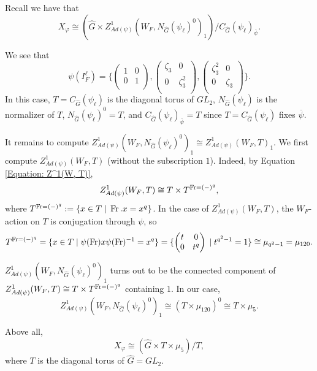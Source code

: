 \begin{eg}
    Recall we have that
    $$X_{\varphi} \cong (\hat{G} \times Z^1_{Ad(\psi)}(W_F, N_{\hat{G}}(\psi_{\ell})^0)_1)/C_{\hat{G}}(\psi_{\ell})_{\overline{\psi}}.$$
    
    We see that 
    $$\psi(I_F^{\ell})=\{
    \begin{pmatrix}
    	1 & 0 \\
    	0 & 1 \\
    \end{pmatrix},
    \begin{pmatrix}
    	\zeta_3 & 0 \\
    	0 & \zeta_3^2 \\
    \end{pmatrix},
    \begin{pmatrix}
    	\zeta_3^2 & 0 \\
    	0 & \zeta_3 \\
    \end{pmatrix}
    \}.$$ 
    In this case, $T=C_{\hat{G}}(\psi_{\ell})$ is the diagonal torus of $GL_2$, $N_{\hat{G}}(\psi_{\ell})$ is the normalizer of $T$, $N_{\hat{G}}(\psi_{\ell})^0=T$, and $C_{\hat{G}}(\psi_{\ell})_{\overline{\psi}}=T$ since $T=C_{\hat{G}}(\psi_{\ell})$ fixes $\overline{\psi}$.
    
    It remains to compute $Z^1_{Ad(\psi)}(W_F, N_{\hat{G}}(\psi_{\ell})^0)_1 \cong Z^1_{Ad(\psi)}(W_F, T)_1$. We first compute $Z^1_{Ad(\psi)}(W_F, T)$ (without the subscription $1$). Indeed, by Equation \ref{Equation: Z^1(W, T)}, 
    $$Z^1_{Ad(\psi)}(W_F, T) \cong T \times T^{\operatorname{Fr}=(-)^q},$$
    where $T^{\operatorname{Fr}=(-)^q}:=\{x \in T \;|\; \operatorname{Fr}.x=x^q\}$.
    In the case of $Z^1_{Ad(\psi)}(W_F, T)$, the $W_F$-action on $T$ is conjugation through $\psi$, so 
    $$T^{\operatorname{Fr}=(-)^q}=\{x \in T \;|\; \psi(\operatorname{Fr})x\psi(\operatorname{Fr})^{-1}=x^q\}
    =\{\begin{pmatrix}
    	t & 0 \\
    	0 & t^q \\
    \end{pmatrix} \;|\; t^{q^2-1}=1\}
    \cong \mu_{q^2-1}=\mu_{120}.$$
    
    $Z^1_{Ad(\psi)}(W_F, N_{\hat{G}}(\psi_{\ell})^0)_1$ turns out to be the connected component of $Z^1_{Ad(\psi)}(W_F, T) \cong T \times T^{\operatorname{Fr}=(-)^q}$ containing $1$. In our case,
    $$Z^1_{Ad(\psi)}(W_F, N_{\hat{G}}(\psi_{\ell})^0)_1 \cong (T \times \mu_{120})^0 \cong T \times \mu_5.$$
    
    Above all, 
    $$X_{\varphi} \cong (\hat{G} \times T \times \mu_5)/T,$$
    where $T$ is the diagonal torus of $\hat{G}=GL_2$.
    
    
     
\end{eg}

